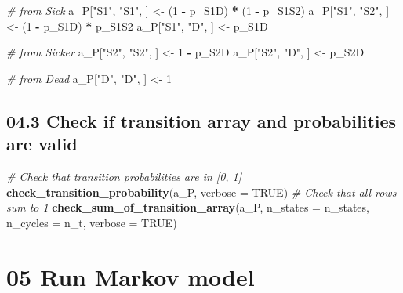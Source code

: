 \documentclass[
]{article}
\newenvironment{Shaded}{\begin{snugshade}}{\end{snugshade}}
\newcommand{\CommentTok}[1]{\textcolor[rgb]{0.56,0.35,0.01}{\textit{#1}}}
\newcommand{\DataTypeTok}[1]{\textcolor[rgb]{0.13,0.29,0.53}{#1}}
\newcommand{\DecValTok}[1]{\textcolor[rgb]{0.00,0.00,0.81}{#1}}
\newcommand{\KeywordTok}[1]{\textcolor[rgb]{0.13,0.29,0.53}{\textbf{#1}}}
\newcommand{\NormalTok}[1]{#1}
\newcommand{\OperatorTok}[1]{\textcolor[rgb]{0.81,0.36,0.00}{\textbf{#1}}}
\newcommand{\OtherTok}[1]{\textcolor[rgb]{0.56,0.35,0.01}{#1}}
\newcommand{\StringTok}[1]{\textcolor[rgb]{0.31,0.60,0.02}{#1}}
\begin{document}
\begin{Shaded}
\begin{Highlighting}[]
\CommentTok{# from Sick}
\NormalTok{a_P[}\StringTok{"S1"}\NormalTok{, }\StringTok{"S1"}\NormalTok{, ] <-}\StringTok{ }\NormalTok{(}\DecValTok{1} \OperatorTok{-}\StringTok{ }\NormalTok{p_S1D) }\OperatorTok{*}\StringTok{ }\NormalTok{(}\DecValTok{1} \OperatorTok{-}\StringTok{ }\NormalTok{p_S1S2)}
\NormalTok{a_P[}\StringTok{"S1"}\NormalTok{, }\StringTok{"S2"}\NormalTok{, ] <-}\StringTok{ }\NormalTok{(}\DecValTok{1} \OperatorTok{-}\StringTok{ }\NormalTok{p_S1D) }\OperatorTok{*}\StringTok{ }\NormalTok{p_S1S2}
\NormalTok{a_P[}\StringTok{"S1"}\NormalTok{, }\StringTok{"D"}\NormalTok{, ]  <-}\StringTok{  }\NormalTok{p_S1D}

\CommentTok{# from Sicker}
\NormalTok{a_P[}\StringTok{"S2"}\NormalTok{, }\StringTok{"S2"}\NormalTok{, ] <-}\StringTok{ }\DecValTok{1} \OperatorTok{-}\StringTok{ }\NormalTok{p_S2D}
\NormalTok{a_P[}\StringTok{"S2"}\NormalTok{, }\StringTok{"D"}\NormalTok{, ]  <-}\StringTok{ }\NormalTok{p_S2D}

\CommentTok{# from Dead}
\NormalTok{a_P[}\StringTok{"D"}\NormalTok{, }\StringTok{"D"}\NormalTok{, ] <-}\StringTok{ }\DecValTok{1}
\end{Highlighting}
\end{Shaded}

\hypertarget{check-if-transition-array-and-probabilities-are-valid}{%
\subsection{04.3 Check if transition array and probabilities are
valid}\label{check-if-transition-array-and-probabilities-are-valid}}

\begin{Shaded}
\begin{Highlighting}[]
\CommentTok{# Check that transition probabilities are in [0, 1]}
\KeywordTok{check_transition_probability}\NormalTok{(a_P, }\DataTypeTok{verbose =} \OtherTok{TRUE}\NormalTok{)}
\CommentTok{# Check that all rows sum to 1}
\KeywordTok{check_sum_of_transition_array}\NormalTok{(a_P, }\DataTypeTok{n_states =}\NormalTok{ n_states, }\DataTypeTok{n_cycles =}\NormalTok{ n_t, }\DataTypeTok{verbose =} \OtherTok{TRUE}\NormalTok{)}
\end{Highlighting}
\end{Shaded}

\hypertarget{run-markov-model}{%
\section{05 Run Markov model}\label{run-markov-model}}
\end{document}
